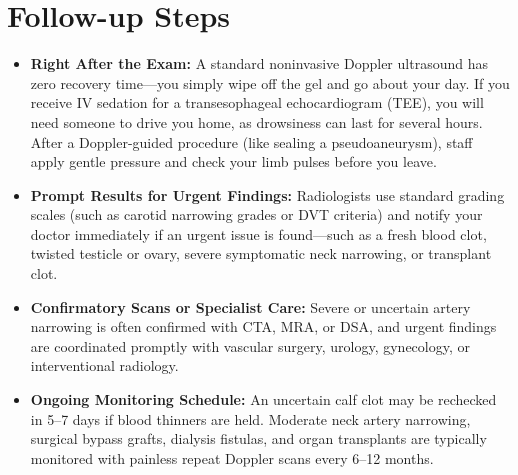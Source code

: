 \section{Follow-up Steps}
\begin{itemize}
\item \textbf{Right After the Exam:} A standard noninvasive Doppler ultrasound has zero recovery time---you simply wipe off the gel and go about your day. If you receive IV sedation for a transesophageal echocardiogram (TEE), you will need someone to drive you home, as drowsiness can last for several hours. After a Doppler-guided procedure (like sealing a pseudoaneurysm), staff apply gentle pressure and check your limb pulses before you leave.
\item \textbf{Prompt Results for Urgent Findings:} Radiologists use standard grading scales (such as carotid narrowing grades or DVT criteria) and notify your doctor immediately if an urgent issue is found---such as a fresh blood clot, twisted testicle or ovary, severe symptomatic neck narrowing, or transplant clot.
\item \textbf{Confirmatory Scans or Specialist Care:} Severe or uncertain artery narrowing is often confirmed with CTA, MRA, or DSA, and urgent findings are coordinated promptly with vascular surgery, urology, gynecology, or interventional radiology.
\item \textbf{Ongoing Monitoring Schedule:} An uncertain calf clot may be rechecked in 5--7 days if blood thinners are held. Moderate neck artery narrowing, surgical bypass grafts, dialysis fistulas, and organ transplants are typically monitored with painless repeat Doppler scans every 6--12 months.
\end{itemize}

